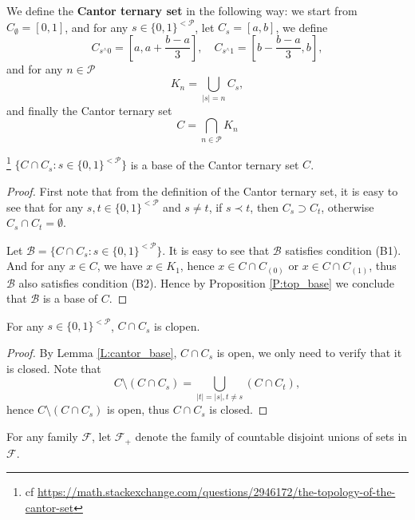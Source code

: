 \begin{definition}
We define the \textbf{Cantor ternary set} 
in the following way:
we start from $C_{\emptyset}=[0,1]$,
and for any $s\in\{0,1\}^{<\mathcal{P}}$, let $C_s=[a,b]$, we define
\[
	C_{s^\wedge 0} = \left[ a, a+\frac{b-a}{3} \right], \quad 
	C_{s^\wedge 1} = \left[ b-\frac{b-a}{3}, b \right],
\]
and for any $n\in\mathcal{P}$
\[
	K_n=\bigcup_{|s|=n} C_s,
\]
and finally the Cantor ternary set
\[
	C=\bigcap_{n\in\mathcal{P}} K_n
\]
\end{definition}

\begin{lemma} \label{L:cantor_base}
\footnote{cf
\url{https://math.stackexchange.com/questions/2946172/the-topology-of-the-cantor-set}
}
$\{C\cap C_s: s\in\{0,1\}^{<\mathcal{P}} \}$ is a base of the Cantor ternary
set $C$.
\end{lemma}
\begin{proof}
First note that from the definition of the Cantor ternary set, it is easy to see 
that for any $s,t \in\{0,1\}^{<\mathcal{P}}$ and $s\neq t$, if $s\prec t$, then 
$C_s\supset C_t$, otherwise $C_s\cap C_t=\emptyset$.

Let $\mathcal{B}=\{C\cap C_s: s\in\{0,1\}^{<\mathcal{P}} \}$. It is easy to
see that $\mathcal{B}$ satisfies condition (B1). And for any $x\in C$, we have
$x\in K_1$, hence $x\in C\cap C_{(0)}$ or $x\in C\cap C_{(1)}$, thus
$\mathcal{B}$ also satisfies condition (B2).
Hence by Proposition \ref{P:top_base} we conclude that $\mathcal{B}$ is a base of
$C$.
\end{proof}

\begin{lemma}
For any $s\in\{0,1\}^{<\mathcal{P}}$, $C\cap C_s$ is clopen.
\end{lemma}
\begin{proof}
By Lemma \ref{L:cantor_base}, $C\cap C_s$ is open, we only need to verify
that it is closed. Note that
\[
  C\setminus (C\cap C_s) 
	= \bigcup_{ |t|=|s|, t\neq s } (C\cap C_t),
\]
hence $C\setminus (C\cap C_s)$ is open, thus $C\cap C_s$ is closed.
\end{proof}

For any family $\mathcal{F}$, let $\mathcal{F}_+$ denote the family of countable
disjoint unions of sets in $\mathcal{F}$.

